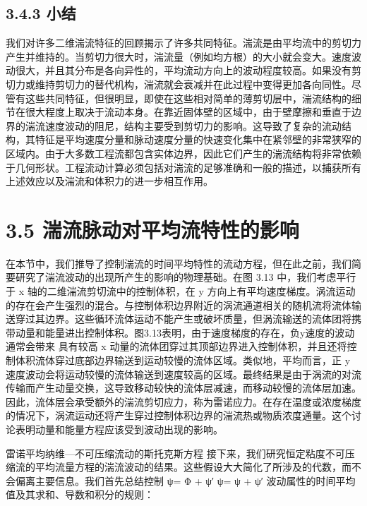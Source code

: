 \documentclass[11pt,a4paper,openany,fontset=none]{ctexbook}
\begin{document}
\subsection*{3.4.3 小结}

我们对许多二维湍流特征的回顾揭示了许多共同特征。湍流是由平均流中的剪切力产生并维持的。当剪切力很大时，湍流量（例如均方根）的大小就会变大。速度波动很大，并且其分布是各向异性的，平均流动方向上的波动程度较高。如果没有剪切力或维持剪切力的替代机构，湍流就会衰减并在此过程中变得更加各向同性。尽管有这些共同特征，但很明显，即使在这些相对简单的薄剪切层中，湍流结构的细节在很大程度上取决于流动本身。在靠近固体壁的区域中，由于壁摩擦和垂直于边界的湍流速度波动的阻尼，结构主要受到剪切力的影响。这导致了复杂的流动结构，其特征是平均速度分量和脉动速度分量的快速变化集中在紧邻壁的非常狭窄的区域内。由于大多数工程流都包含实体边界，因此它们产生的湍流结构将非常依赖于几何形状。工程流动计算必须包括对湍流的足够准确和一般的描述，以捕获所有上述效应以及湍流和体积力的进一步相互作用。

\section*{3.5 湍流脉动对平均流特性的影响}

在本节中，我们推导了控制湍流的时间平均特性的流动方程，但在此之前，我们简要研究了湍流波动的出现所产生的影响的物理基础。在图 3.13 中，我们考虑平行于 x 轴的二维湍流剪切流中的控制体积，在 y 方向上有平均速度梯度。涡流运动的存在会产生强烈的混合。与控制体积边界附近的涡流通道相关的随机流将流体输送穿过其边界。这些循环流体运动不能产生或破坏质量，但涡流输送的流体团将携带动量和能量进出控制体积。图3.13表明，由于速度梯度的存在，负y速度的波动通常会带来
具有较高 x 动量的流体团穿过其顶部边界进入控制体积，并且还将控制体积流体穿过底部边界输送到运动较慢的流体区域。类似地，平均而言，正 y 速度波动会将运动较慢的流体输送到速度较高的区域。最终结果是由于涡流的对流传输而产生动量交换，这导致移动较快的流体层减速，而移动较慢的流体层加速。因此，流体层会承受额外的湍流剪切应力，称为雷诺应力。在存在温度或浓度梯度的情况下，涡流运动还将产生穿过控制体积边界的湍流热或物质浓度通量。这个讨论表明动量和能量方程应该受到波动出现的影响。

雷诺平均纳维---不可压缩流动的斯托克斯方程
接下来，我们研究恒定粘度不可压缩流的平均流量方程的湍流波动的结果。这些假设大大简化了所涉及的代数，而不会偏离主要信息。我们首先总结控制 ψ= Φ + ψ′ ψ= ψ + ψ′ 波动属性的时间平均值及其求和、导数和积分的规则：
\end{document}
